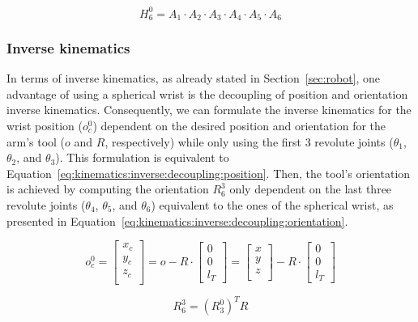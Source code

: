 \documentclass[10pt,a4paper,notitlepage,twocolumn,twoside]{article}
\begin{document}
\begin{equation}\label{eq:kinematics:forward}
H_6^0 = A_1 \cdot A_2 \cdot A_3 \cdot A_4 \cdot A_5 \cdot A_6
\end{equation}

\subsubsection{Inverse kinematics}

In terms of inverse kinematics, as already stated in Section~\ref{sec:robot}, one advantage of using a spherical wrist is the decoupling of position and orientation inverse kinematics. Consequently, we can formulate the inverse kinematics for the wrist position ($o_c^0$) dependent on the desired position and orientation for the arm's tool ($o$ and $R$, respectively) while only using the first 3 revolute joints ($\theta_1$, $\theta_2$, and $\theta_3$). This formulation is equivalent to Equation~\ref{eq:kinematics:inverse:decoupling:position}. Then, the tool's orientation is achieved by computing the orientation $R_6^3$ only dependent on the last three revolute joints ($\theta_4$, $\theta_5$, and $\theta_6$) equivalent to the ones of the spherical wrist, as presented in Equation~\ref{eq:kinematics:inverse:decoupling:orientation}.

\begin{equation}\label{eq:kinematics:inverse:decoupling:position}
o_c^0 = \begin{bmatrix}
x_c\\y_c\\z_c\\
\end{bmatrix} = o - R \cdot \begin{bmatrix}
0\\0\\l_T
\end{bmatrix} = \begin{bmatrix}
x\\y\\z\\
\end{bmatrix} - R \cdot \begin{bmatrix}
0\\0\\l_T
\end{bmatrix}
\end{equation}

\begin{equation}\label{eq:kinematics:inverse:decoupling:orientation}
R_6^3 = \left(R_3^0\right)^T R
\end{equation}
\end{document}
